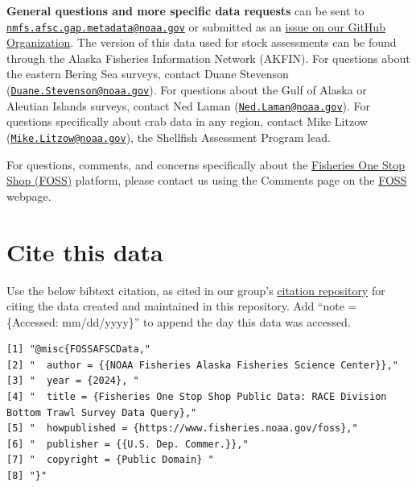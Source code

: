 \documentclass[
  letterpaper,
  oneside,
  open=any]{scrbook}
\begin{document}
\textbf{General questions and more specific data requests} can be sent
to
\href{mailto:nmfs.afsc.gap.metadata@noaa.gov}{\nolinkurl{nmfs.afsc.gap.metadata@noaa.gov}}
or submitted as an
\href{https://github.com/afsc-gap-products/data-requests}{issue on our
GitHub Organization}. The version of this data used for stock
assessments can be found through the Alaska Fisheries Information
Network (AKFIN). For questions about the eastern Bering Sea surveys,
contact Duane Stevenson
(\href{mailto:Duane.Stevenson@noaa.gov}{\nolinkurl{Duane.Stevenson@noaa.gov}}).
For questions about the Gulf of Alaska or Aleutian Islands surveys,
contact Ned Laman
(\href{mailto:Ned.Laman@noaa.gov}{\nolinkurl{Ned.Laman@noaa.gov}}). For
questions specifically about crab data in any region, contact Mike
Litzow
(\href{mailto:Mike.Litzow@noaa.gov}{\nolinkurl{Mike.Litzow@noaa.gov}}),
the Shellfish Assessment Program lead.

For questions, comments, and concerns specifically about the
\href{https://www.fisheries.noaa.gov/foss}{Fisheries One Stop Shop
(FOSS)} platform, please contact us using the Comments page on the
\href{https://www.fisheries.noaa.gov/foss}{FOSS} webpage.

\section*{Cite this data}\label{cite-this-data-3}


Use the below bibtext citation, as cited in our group's
\href{https://github.com/afsc-gap-products/citations/blob/main/cite/bibliography.bib}{citation
repository} for citing the data created and maintained in this
repository. Add ``note = \{Accessed: mm/dd/yyyy\}'' to append the day
this data was accessed.

\begin{verbatim}
[1] "@misc{FOSSAFSCData,"                                                                           
[2] "  author = {{NOAA Fisheries Alaska Fisheries Science Center}},"                                
[3] "  year = {2024}, "                                                                             
[4] "  title = {Fisheries One Stop Shop Public Data: RACE Division Bottom Trawl Survey Data Query},"
[5] "  howpublished = {https://www.fisheries.noaa.gov/foss},"                                       
[6] "  publisher = {{U.S. Dep. Commer.}},"                                                          
[7] "  copyright = {Public Domain} "                                                                
[8] "}"                                                                                             
\end{verbatim}
\end{document}
